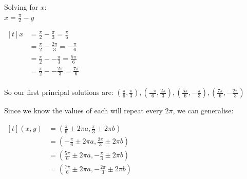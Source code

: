\documentclass[../main.tex]{subfiles}
\begin{document}
\begin{enumerate}
    Solving for \(x\):\\
    \(x=\frac{\pi}{2}-y\)

    $
    \!
    \begin{aligned}[t]
        x
        &=\frac{\pi}{2}-\frac{\pi}{3}=\frac{\pi}{6}\\
        &=\frac{\pi}{2}-\frac{2\pi}{3}=-\frac{\pi}{6}\\
        &=\frac{\pi}{2}--\frac{\pi}{3}=\frac{5\pi}{6}\\
        &=\frac{\pi}{2}--\frac{2\pi}{3}=\frac{7\pi}{6}\\
    \end{aligned}
    $

    So our first principal solutions are: \((\frac{\pi}{6}, \frac{\pi}{3}), (\frac{-\pi}{6}, \frac{2\pi}{3}), (\frac{5\pi}{6}, -\frac{\pi}{3}), (\frac{7\pi}{6}, -\frac{2\pi}{3})\)
    
    Since we know the values of each will repeat every \(2\pi\), we can generalise:

    $
    \!
    \begin{aligned}[t]
        (x,y)
        &=(\frac{\pi}{6}\pm 2\pi a, \frac{\pi}{3}\pm 2\pi b)\\
        &=(-\frac{\pi}{6}\pm 2\pi a, \frac{2\pi}{3}\pm 2\pi b)\\
        &=(\frac{5\pi}{6}\pm 2\pi a, -\frac{\pi}{3}\pm 2\pi b)\\
        &=(\frac{7\pi}{6}\pm 2\pi a, -\frac{2\pi}{3}\pm 2\pi b)
    \end{aligned}
    $

\end{enumerate}
\end{document}
